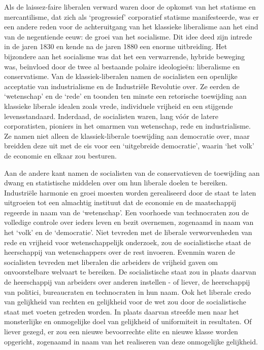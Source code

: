 \documentclass[
  a5paper,
  smalldemyvopaper,10pt,twoside,onecolumn,openright,extrafontsizes,hidelinks]{memoir}
\begin{document}
Als de laissez-faire liberalen verward waren door de opkomst van het
statisme en mercantilisme, dat zich als `progressief' corporatief
statisme manifesteerde, was er een andere reden voor de achteruitgang
van het klassieke liberalisme aan het eind van de negentiende eeuw: de
groei van het socialisme. Dit idee deed zijn intrede in de jaren 1830 en
kende na de jaren 1880 een enorme uitbreiding. Het bijzondere aan het
socialisme was dat het een verwarrende, hybride beweging was, beïnvloed
door de twee al bestaande polaire ideologieën: liberalisme en
conservatisme. Van de klassiek-liberalen namen de socialisten een
openlijke acceptatie van industrialisme en de Industriële Revolutie
over. Ze eerden de `wetenschap' en de `rede' en toonden ten minste een
retorische toewijding aan klassieke liberale idealen zoals vrede,
individuele vrijheid en een stijgende levensstandaard. Inderdaad, de
socialisten waren, lang vóór de latere corporatisten, pioniers in het
omarmen van wetenschap, rede en industrialisme. Ze namen niet alleen de
klassiek-liberale toewijding aan democratie over, maar breidden deze uit
met de eis voor een `uitgebreide democratie', waarin `het volk' de
economie en elkaar zou besturen.

Aan de andere kant namen de socialisten van de conservatieven de
toewijding aan dwang en statistische middelen over om hun liberale
doelen te bereiken. Industriële harmonie en groei moesten worden
gerealiseerd door de staat te laten uitgroeien tot een almachtig
instituut dat de economie en de maatschappij regeerde in naam van de
`wetenschap'. Een voorhoede van technocraten zou de volledige controle
over ieders leven en bezit overnemen, zogenaamd in naam van het `volk'
en de `democratie'. Niet tevreden met de liberale verworvenheden van
rede en vrijheid voor wetenschappelijk onderzoek, zou de socialistische
staat de heerschappij van wetenschappers over de rest invoeren. Evenmin
waren de socialisten tevreden met liberalen die arbeiders de vrijheid
gaven om onvoorstelbare welvaart te bereiken. De socialistische staat
zou in plaats daarvan de heerschappij van arbeiders over anderen
instellen - of liever, de heerschappij van politici, bureaucraten en
technocraten in hun naam. Ook het liberale credo van gelijkheid van
rechten en gelijkheid voor de wet zou door de socialistische staat met
voeten getreden worden. In plaats daarvan streefde men naar het
monsterlijke en onmogelijke doel van gelijkheid of uniformiteit in
resultaten. Of liever gezegd, er zou een nieuwe bevoorrechte elite en
nieuwe klasse worden opgericht, zogenaamd in naam van het realiseren van
deze onmogelijke gelijkheid.
\end{document}
